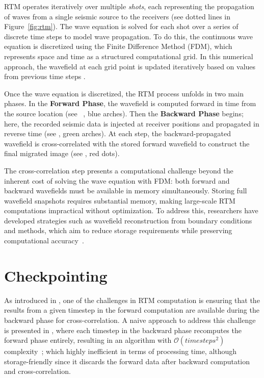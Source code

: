 \documentclass[Ingles]{ic-tese-v3}
\begin{document}



RTM operates iteratively over multiple \textit{shots}, each representing the propagation of waves from a single seismic source to the receivers (see dotted lines in Figure~\ref{fig:rtm}). The wave equation is solved for each shot over a series of discrete time steps to model wave propagation. To do this, the continuous wave equation is discretized using the Finite Difference Method (FDM), which represents space and time as a structured computational grid. In this numerical approach, the wavefield at each grid point is updated iteratively based on values from previous time steps \cite{etgen2009}.

Once the wave equation is discretized, the RTM process unfolds in two main phases. In the \textbf{Forward Phase}, the wavefield is computed forward in time from the source location (see ~, blue arches). Then the \textbf{Backward Phase} begins; here, the recorded seismic data is injected at receiver positions and propagated in reverse time (see , green arches). At each step, the backward-propagated wavefield is cross-correlated with the stored forward wavefield to construct the final migrated image (see , red dots)\cite{etgen2009}.

The cross-correlation step presents a computational challenge beyond the inherent cost of solving the wave equation with FDM: both forward and backward wavefields must be available in memory simultaneously. Storing full wavefield snapshots requires substantial memory, making large-scale RTM computations impractical without optimization. To address this, researchers have developed strategies such as wavefield reconstruction from boundary conditions and \checkpointing methods, which aim to reduce storage requirements while preserving computational accuracy~\cite{dussand2008, symes2007}.



\section{Checkpointing}
\label{sec:chkpt}

As introduced in , one of the challenges in RTM computation is ensuring that the results from a given timestep in the forward computation are available during the backward phase for cross-correlation. A naive approach to address this challenge is presented in , where each timestep in the backward phase recomputes the forward phase entirely, resulting in an algorithm with $\mathcal{O}(\textit{timesteps}^2)$ complexity~\cite{symes2007}; which highly inefficient in terms of processing time, although storage-friendly since it discards the forward data after backward computation and cross-correlation.
\end{document}
